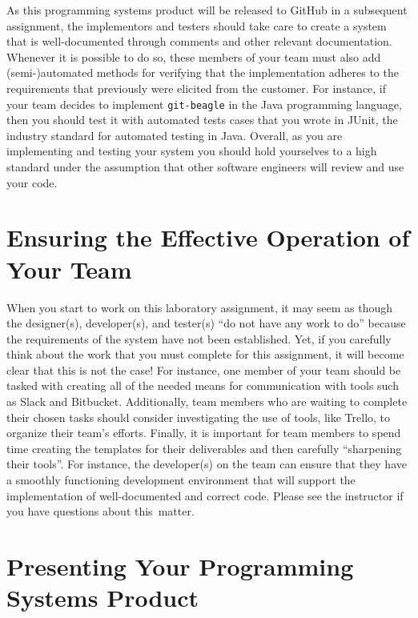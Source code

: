 As this programming systems product will be released to GitHub in a subsequent assignment, the implementors and testers
should take care to create a system that is well-documented through comments and other relevant documentation. Whenever
it is possible to do so, these members of your team must also add (semi-)automated methods for verifying that the
implementation adheres to the requirements that previously were elicited from the customer. For instance, if your team
decides to implement {\tt git-beagle} in the Java programming language, then you should test it with automated tests
cases that you wrote in JUnit, the industry standard for automated testing in Java. Overall, as you are implementing and
testing your system you should hold yourselves to a high standard under the assumption that other software engineers
will review and use your code.

\section*{Ensuring the Effective Operation of Your Team}

When you start to work on this laboratory assignment, it may seem as though the designer(s), developer(s), and tester(s)
``do not have any work to do'' because the requirements of the system have not been established. Yet, if you carefully
think about the work that you must complete for this assignment, it will become clear that this is not the case! For
instance, one member of your team should be tasked with creating all of the needed means for communication with tools
such as Slack and Bitbucket. Additionally, team members who are waiting to complete their chosen tasks should consider
investigating the use of tools, like Trello, to organize their team's efforts. Finally, it is important for team
members to spend time creating the templates for their deliverables and then carefully ``sharpening their tools''. For
instance, the developer(s) on the team can ensure that they have a smoothly functioning development environment that
will support the implementation of well-documented and correct code. Please see the instructor if you have questions
about \mbox{this matter}.

\section*{Presenting Your Programming Systems Product}

